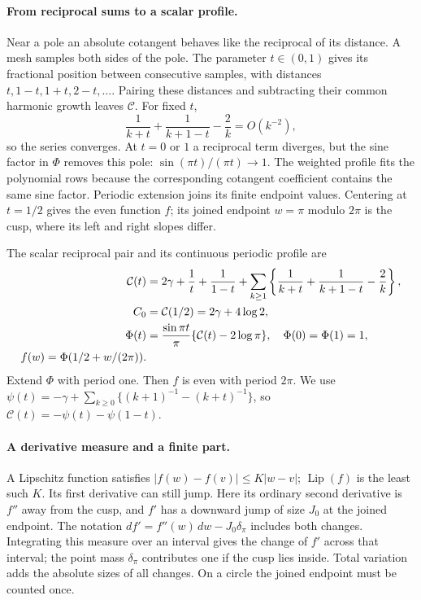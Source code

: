 \paragraph{From reciprocal sums to a scalar profile.}
Near a pole an absolute cotangent behaves like the reciprocal of its
distance. A mesh samples both sides of the pole. The parameter
$t\in(0,1)$ gives its fractional position between consecutive samples,
with distances $t,1-t,1+t,2-t,\ldots$. Pairing these distances and
subtracting their common harmonic growth leaves $\mathcal C$. For
fixed $t$,
\[
 \frac1{k+t}+\frac1{k+1-t}-\frac2k=O(k^{-2}),
\]
so the series converges. At $t=0$ or $1$ a reciprocal term diverges,
but the sine factor in $\Phi$ removes this pole:
$\sin(\pi t)/(\pi t)\to1$. The weighted profile fits the polynomial
rows because the corresponding cotangent coefficient contains the same
sine factor. Periodic extension joins its finite endpoint values.
Centering at $t=1/2$ gives the even function $f$; its joined endpoint
$w=\pi$ modulo $2\pi$ is the cusp, where its left and right slopes
differ.

The scalar reciprocal pair and its continuous periodic profile are
\begin{align}\label{uc:scalar-definitions}
 \mathcal C(t)&=2\gamma+\frac1t+\frac1{1-t}
 +\sum_{k\geq1}\left\{\frac1{k+t}+\frac1{k+1-t}-\frac2k\right\},
 \notag\\
 C_0&=\mathcal C(1/2)=2\gamma+4\log2,\notag\\
 \Phi(t)&=\frac{\sin\pi t}{\pi}\{\mathcal C(t)-2\log\pi\},
 \quad\Phi(0)=\Phi(1)=1,\notag\\
 f(w)=\Phi(1/2+w/(2\pi)).
\end{align}
Extend $\Phi$ with period one. Then $f$ is even with period $2\pi$.
We use $\psi(t)=-\gamma+\sum_{k\geq0}\{(k+1)^{-1}-(k+t)^{-1}\}$,
so $\mathcal C(t)=-\psi(t)-\psi(1-t)$.

\paragraph{A derivative measure and a finite part.}
A Lipschitz function satisfies $|f(w)-f(v)|\leq K|w-v|$;
$\operatorname{Lip}(f)$ is the least such $K$. Its first
derivative can still jump. Here its ordinary second derivative is $f''$
away from the cusp, and $f'$ has a downward jump of size $J_0$ at the
joined endpoint. The notation $df'=f''(w)\,dw-J_0\delta_\pi$ includes
both changes. Integrating this measure over an interval gives the
change of $f'$ across that interval; the point mass $\delta_\pi$
contributes one if the cusp lies inside. Total variation adds the
absolute sizes of all changes. On a circle the joined endpoint must
be counted once.

